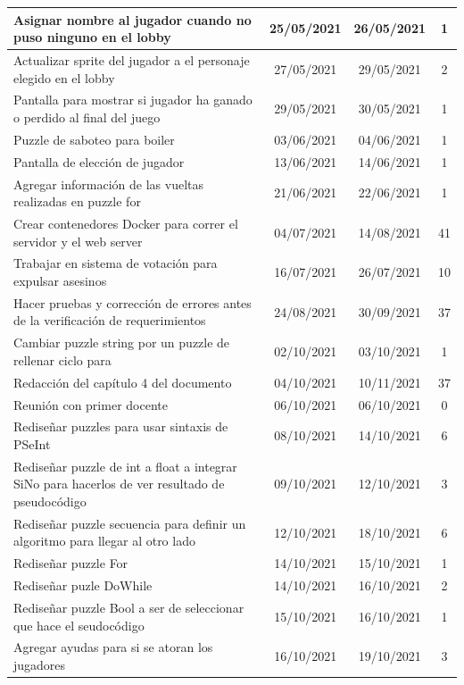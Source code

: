 \begin{longtable}[c]{|m{5cm}|c|c|c|}
        Asignar nombre al jugador cuando no puso ninguno en el lobby & 25/05/2021 & 26/05/2021 & 1 \\ \hline
        Actualizar sprite del jugador a el personaje elegido en el lobby & 27/05/2021 & 29/05/2021 & 2 \\ \hline
        Pantalla para mostrar si jugador ha ganado o perdido al final del juego & 29/05/2021 & 30/05/2021 & 1 \\ \hline
        Puzzle de saboteo para boiler & 03/06/2021 & 04/06/2021 & 1 \\ \hline
        Pantalla de elección de jugador & 13/06/2021 & 14/06/2021 & 1 \\ \hline
        Agregar información de las vueltas realizadas en puzzle for & 21/06/2021 & 22/06/2021 & 1 \\ \hline
        Crear contenedores Docker para correr el servidor y el web server & 04/07/2021 & 14/08/2021 & 41 \\ \hline
        Trabajar en sistema de votación para expulsar asesinos & 16/07/2021 & 26/07/2021 & 10 \\ \hline
        Hacer pruebas y corrección de errores antes de la verificación de requerimientos & 24/08/2021 & 30/09/2021 & 37 \\ \hline
        Cambiar puzzle string por un puzzle de rellenar ciclo para & 02/10/2021 & 03/10/2021 & 1 \\ \hline
        Redacción del capítulo 4 del documento & 04/10/2021 & 10/11/2021 & 37 \\ \hline
        Reunión con primer docente & 06/10/2021 & 06/10/2021 & 0 \\ \hline
        Rediseñar puzzles para usar sintaxis de PSeInt & 08/10/2021 & 14/10/2021 & 6 \\ \hline
        Rediseñar puzzle de int a float a integrar SiNo para hacerlos de ver resultado de pseudocódigo & 09/10/2021 & 12/10/2021 & 3 \\ \hline
        Rediseñar puzzle secuencia para definir un algoritmo para llegar al otro lado & 12/10/2021 & 18/10/2021 & 6 \\ \hline
        Rediseñar puzzle For & 14/10/2021 & 15/10/2021 & 1 \\ \hline
        Rediseñar puzle DoWhile & 14/10/2021 & 16/10/2021 & 2 \\ \hline
        Rediseñar puzzle Bool a ser de seleccionar que hace el seudocódigo & 15/10/2021 & 16/10/2021 & 1 \\ \hline
        Agregar ayudas para si se atoran los jugadores & 16/10/2021 & 19/10/2021 & 3 \\ \hline

\end{longtable}
